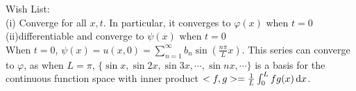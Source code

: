 Wish List:\\
(i) Converge for all $x, t$. In particular, it converges to $\varphi(x)$ when $t=0$\\
(ii)differentiable and converge to $\psi(x)$ when $t=0$\\
When $t=0$, $\psi(x)=u(x,0)=\sum_{n=1}^\infty b_n\sin(\frac{n\pi}{L} x)$. This series can converge to $\varphi$, as when $L=\pi$, $\{\sin x,\sin 2x, \sin 3x,\cdots,\sin nx,\cdots\}$ is a basis for the continuous function space with inner product $<f,g>=\frac{1}{L}\int_0^L fg(x)\,\mathrm{d} x$. 





